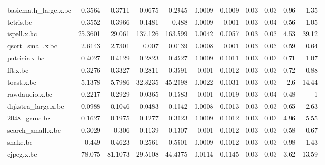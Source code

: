\begin{tabular}{lrrrrrrrrrr}
 basicmath\_large.x.bc &          0.3564 &          0.3711 &   0.0675 &   0.2945 &   0.0009 &   0.0009 &           0.03 &           0.03 &           0.96 &           1.35 \\
 tetris.bc            &          0.3552 &          0.3966 &   0.1481 &   0.488  &   0.0009 &   0.001  &           0.03 &           0.04 &           0.56 &           1.05 \\
 ispell.x.bc          &         25.3601 &         29.061  & 137.126  & 163.599  &   0.0042 &   0.0057 &           0.03 &           0.03 &           4.53 &          39.12 \\
 qsort\_small.x.bc     &          2.6143 &          2.7301 &   0.007  &   0.0139 &   0.0008 &   0.001  &           0.03 &           0.03 &           0.59 &           0.64 \\
 patricia.x.bc        &          0.4027 &          0.4129 &   0.2823 &   0.4527 &   0.0009 &   0.0011 &           0.03 &           0.03 &           0.71 &           1.07 \\
 fft.x.bc             &          0.3276 &          0.3327 &   0.2811 &   0.3591 &   0.001  &   0.0012 &           0.03 &           0.03 &           0.72 &           0.88 \\
 toast.x.bc           &          5.1378 &          5.7986 &  32.8235 &  45.2098 &   0.0022 &   0.0031 &           0.03 &           0.03 &           2.6  &          14.44 \\
 rawdaudio.x.bc       &          0.2217 &          0.2929 &   0.0365 &   0.1583 &   0.001  &   0.0019 &           0.03 &           0.04 &           0.48 &           1    \\
 dijkstra\_large.x.bc  &          0.0988 &          0.1046 &   0.0483 &   0.1042 &   0.0008 &   0.0013 &           0.03 &           0.03 &           0.65 &           2.63 \\
 2048\_game.bc         &          0.1627 &          0.1975 &   0.1277 &   0.3023 &   0.0009 &   0.0012 &           0.03 &           0.03 &           4.96 &           5.55 \\
 search\_small.x.bc    &          0.3029 &          0.306  &   0.1139 &   0.1307 &   0.001  &   0.0012 &           0.03 &           0.03 &           0.58 &           0.67 \\
 snake.bc             &          0.449  &          0.4623 &   0.2561 &   0.5601 &   0.0009 &   0.0012 &           0.03 &           0.03 &           0.98 &           1.43 \\
 cjpeg.x.bc           &         78.075  &         81.1073 &  29.5108 &  44.4375 &   0.0114 &   0.0145 &           0.03 &           0.03 &           3.62 &          13.59 \\

\end{tabular}

